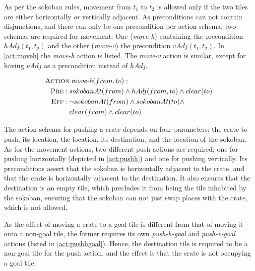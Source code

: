 \documentclass[../master.tex]{subfiles}
\begin{document}
As per the sokoban rules, movement from $t_1$ to $t_2$ is allowed only if the two tiles are either horizontally \textit{or} vertically adjacent. As preconditions can not contain disjunctions, and there can only be one precondition per action schema, two schemas are required for movement: One (\textit{move-h}) containing the precondition $hAdj(t_1,t_2)$ and the other (\textit{move-v}) the precondition $vAdj(t_1, t_2)$.
In \eqref{act:moveh} the \textit{move-h} action is listed. The \textit{move-v} action is similar, except for having $vAdj$ as a precondition instead of $hAdj$.

\begin{align}
\begin{split} \label{act:moveh}
    \textsc{Action} &\; \textit{move-h}(from, to): \\
    \textsc{Pre}: \; & sokobanAt(from) \land hAdj(from, to) \land clear(to) \\
    \textsc{Eff}: \; & \neg sokobanAt(from) \land sokobanAt(to) \land \\
                     & clear(from) \land clear(to)
\end{split}
\end{align}

The action schema for pushing a crate depends on four parameters: the crate to push, its location, the location, its destination, and the location of the sokoban. As for the movement actions, two different push actions are required; one for pushing horizontally (depicted in \eqref{act:pushh}) and one for pushing vertically. Its preconditions assert that the sokoban is horizontally adjacent to the crate, and that the crate is horizontally adjacent to the destination. It also ensures that the destination is an empty tile, which precludes it from being the tile inhabited by the sokoban, ensuring that the sokoban can not just swap places with the crate, which is not allowed.

As the effect of moving a crate to a goal tile is different from that of moving it onto a non-goal tile, the former requires its own \textit{push-h-goal}  and \textit{push-v-goal} actions (listed in \eqref{act:pushhgoal}). Hence, the destination tile is required to be a non-goal tile for the push action, and the effect is that the crate is not occupying a goal tile.
\end{document}
